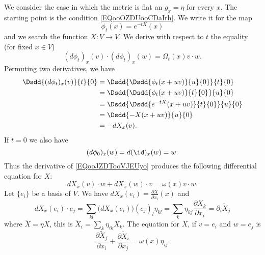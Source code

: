 We consider the case in which the metric is flat an \( g_x=\eta\) for every \( x\).  The starting point is the condition \eqref{EQooOZDUooCDaIrh}. We write it for the map
\begin{equation}
	\phi_t(x)= e^{-tX}(x)
\end{equation}
and we search the function \( X\colon V\to V\). We derive with respect to \( t\) the equality (for fixed \( x\in V\))
\begin{equation}        \label{EQooJZDTooVJEUyo}
	(d\phi_t)_x(v)\cdot (d\phi_t)_x(w)=\Omega_t(x)v\cdot w.
\end{equation}
Permuting two derivatives, we have
\begin{subequations}
	\begin{align}
		\Dsdd{ (d\phi_t)_x(v) }{t}{0} & =\Dsdd{ \Dsdd{   \phi_t(x+uv)  }{u}{0} }{t}{0} \\
		                              & =\Dsdd{\Dsdd{ \phi_t(x+uv) }{t}{0} }{u}{0}     \\
		                              & =\Dsdd{ \Dsdd{  e^{-tX}(x+uv) }{t}{0} }{u}{0}  \\
		                              & =\Dsdd{ -X(x+uv) }{u}{0}                       \\
		                              & =-dX_x(v).
	\end{align}
\end{subequations}
If \( t=0\) we also have
\begin{equation}
	(d\phi_0)_x(w)=d(\id)_x(w)=w.
\end{equation}
Thus the derivative of \eqref{EQooJZDTooVJEUyo} produces the following differential equation for \( X\):
\begin{equation}
	dX_x(v)\cdot w+dX_x(w)\cdot v=\omega(x)v\cdot w.
\end{equation}
Let \( \{ e_i \}\) be a basis of \( V\). We have \( dX_x(e_i)=\frac{ \partial X }{ \partial x_i }(x)\) and
\begin{equation}
	dX_x(e_i)\cdot e_j=\sum_{kl}\big( dX_x(e_i) \big)(e_j)_l\eta_{kl}=\sum_k\eta_{kj}\frac{ \partial X_k }{ \partial x_i }=\partial_i\tilde X_j
\end{equation}
where \( \tilde X=\eta X\), this is \( \tilde X_i=\sum_k\eta_{ik}X_k\). The equation for \( X\), if \( v=e_i\) and \( w=e_j\) is
\begin{equation}        \label{EQooAKZWooOVIdur}
	\frac{ \partial \tilde X_j }{ \partial x_i }+\frac{ \partial \tilde X_i }{ \partial x_j }=\omega(x)\eta_{ij}.
\end{equation}

